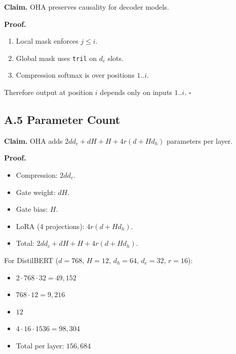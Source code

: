 \textbf{Claim.} OHA preserves causality for decoder models.

\textbf{Proof.} 
\begin{enumerate}
\item Local mask enforces $j \leq i$.
\item Global mask uses \texttt{tril} on $d_c$ slots.
\item Compression softmax is over positions $1..i$.

\end{enumerate}
Therefore output at position $i$ depends only on inputs $1..i$. $\square$

\subsection{A.5 Parameter Count}

\textbf{Claim.} OHA adds $2 d d_c + d H + H + 4 r(d + H d_h)$ parameters per layer.

\textbf{Proof.}
\begin{itemize}
\item Compression: $2 d d_c$.
\item Gate weight: $d H$.
\item Gate bias: $H$.
\item LoRA (4 projections): $4 r(d + H d_h)$.
\item Total: $2 d d_c + d H + H + 4 r(d + H d_h)$.

\end{itemize}
For DistilBERT ($d = 768$, $H = 12$, $d_h = 64$, $d_c = 32$, $r = 16$):
\begin{itemize}
\item $2 \cdot 768 \cdot 32 = 49,152$
\item $768 \cdot 12 = 9,216$
\item $12$
\item $4 \cdot 16 \cdot 1536 = 98,304$
\item Total per layer: $156,684$
\end{itemize}